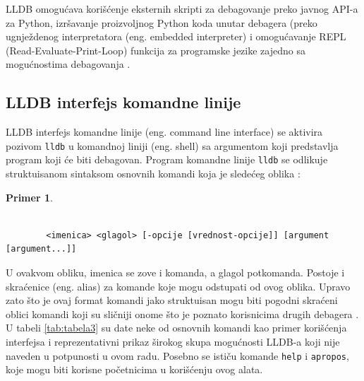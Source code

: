 \documentclass[a4paper]{article}
\newtheorem{primer}{Primer}[section]
\begin{document}
LLDB omogućava korišćenje eksternih skripti za debagovanje
preko javnog API-a za Python, izršavanje proizvoljnog Python koda unutar
debagera \cite{lldb_python} (preko ugnježdenog interpretatora (eng. embedded
interpreter) i omogućavanje REPL (Read-Evaluate-Print-Loop) funkcija za
programske jezike zajedno sa mogućnostima debagovanja \cite{swift_lldb_repl}.

\subsection{LLDB interfejs komandne linije}
LLDB interfejs komandne linije (eng. command line interface) se aktivira pozivom
\verb|lldb| u komandnoj liniji (eng. shell) sa argumentom koji predstavlja program koji
će biti debagovan. Program komandne linije \verb|lldb| se odlikuje struktuisanom sintaksom
osnovnih komandi koja je sledećeg oblika \cite{lldb_tutorial}:
\begin{primer}
	\begin{footnotesize}
		\begin{verbatim}
		
		<imenica> <glagol> [-opcije [vrednost-opcije]] [argument [argument...]]
		\end{verbatim}
	\end{footnotesize}
\end{primer}
U ovakvom obliku, imenica se zove i komanda, a glagol potkomanda. Postoje i
skraćenice (eng. alias) za komande koje mogu odstupati od ovog oblika. Upravo
zato što je ovaj format komandi jako struktuisan mogu biti pogodni skraćeni
oblici komandi koji su sličniji onome što je poznato korisnicima drugih
debagera \cite{apple_lldb_comms}. U tabeli \ref{tab:tabela3} su date neke od
osnovnih komandi kao primer korišćenja interfejsa i reprezentativni prikaz
širokog skupa mogućnosti LLDB-a koji nije naveden u potpunosti u ovom
radu. Posebno se ističu komande \verb|help| i \verb|apropos|, koje mogu biti
korisne početnicima u korišćenju ovog alata.
\end{document}
